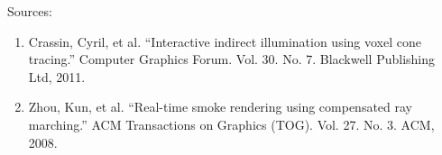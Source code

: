 \documentclass[A4paper]{gdv/gdv}
\newcommand{\teilaufgabe}[1]{\textbf{#1.}}
\begin{document}
\begin{gdvSheet}
% 
% 
% 
Sources:
\begin{enumerate}
\item Crassin, Cyril, et al. ``Interactive indirect illumination using voxel cone tracing.'' Computer Graphics Forum. Vol. 30. No. 7. Blackwell Publishing Ltd, 2011.
\item Zhou, Kun, et al. ``Real-time smoke rendering using compensated ray marching.'' ACM Transactions on Graphics (TOG). Vol. 27. No. 3. ACM, 2008.
\end{enumerate}

\vfill
% 
% 
\end{gdvSheet}
\end{document}

